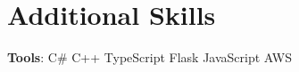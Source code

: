 

\section{Additional Skills}
\begin{itemize}[leftmargin=0.15in, label={}]
\small{\item{\textbf{Tools}:
    C\#\hspace{0.1em}\resumeDot\hspace{0.1em}
    C++\hspace{0.1em}\resumeDot\hspace{0.1em}
    TypeScript\hspace{0.1em}\resumeDot\hspace{0.1em}
    Flask\hspace{0.1em}\resumeDot\hspace{0.1em}
    JavaScript\hspace{0.1em}\resumeDot\hspace{0.1em}
    AWS\hspace{0.1em}\resumeDot\hspace{0.1em}
}}
\end{itemize}
